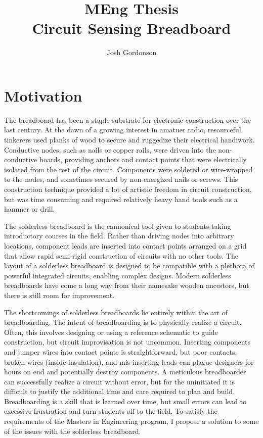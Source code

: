 \documentclass[11pt, a4paper]{article}
\title{MEng Thesis \\ Circuit Sensing Breadboard}
\author{Josh Gordonson}
\begin{document}
\maketitle

\section{Motivation}
The breadboard has been a staple substrate for electronic construction over the last century.
At the dawn of a growing interest in amatuer radio, resourceful tinkerers used planks of wood to secure and ruggedize their electrical handiwork.
Conductive nodes, such as nails or copper rails, were driven into the non-conductive boards, providing anchors and contact points that were electrically isolated from the rest of the circuit.
Components were soldered or wire-wrapped to the nodes, and sometimes secured by non-energized nails or screws.
This construction technique provided a lot of artistic freedom in circuit construction, but was time consuming and required relatively heavy hand tools such as a hammer or drill.

The solderless breadboard is the cannonical tool given to students taking introductory courses in the field.
Rather than driving nodes into arbitrary locations, component leads are inserted into contact points arranged on a grid that allow rapid semi-rigid construction of circuits with no other tools.
The layout of a solderless breadboard is designed to be compatible with a plethora of powerful integrated circuits, enabling complex designs.
Modern solderless breadboards have come a long way from their namesake wooden ancestors, but there is still room for improvement. 

The shortcomings of solderless breadboards lie entirely within the art of breadboarding.
The intent of breadboarding is to physically realize a circuit.
Often, this involves designing or using a reference schematic to guide construction, but circuit improvisation is not uncommon.
Inserting components and jumper wires into contact points is straightforward, but poor contacts, broken wires (inside insulation), and mis-inserting leads can plague designers for hours on end and potentially destroy components.
A meticulous breadboarder can successfully realize a circuit without error, but for the uninitiated it is difficult to justify the additional time and care required to plan and build.
Breadboarding is a skill that is learned over time, but small errors can lead to excessive frustration and turn students off to the field.
To satisfy the requirements of the Masters in Engineering program, I propose a solution to some of the issues with the solderless breadboard.
\end{document}
